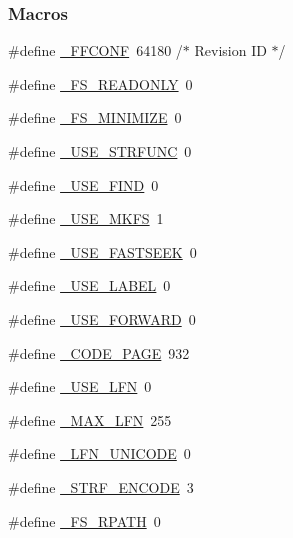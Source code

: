 \subsubsection*{Macros}
\begin{DoxyCompactItemize}
\item 
\#define \hyperlink{ffconf_8h_a45082af332369ed49492446a2d4d4c5a}{\+\_\+\+F\+F\+C\+O\+N\+F}~64180	/$\ast$ Revision I\+D $\ast$/
\item 
\#define \hyperlink{ffconf_8h_afb8d35370cfe0c23832ac2d82e854ec6}{\+\_\+\+F\+S\+\_\+\+R\+E\+A\+D\+O\+N\+L\+Y}~0
\item 
\#define \hyperlink{ffconf_8h_abefed32e4f049538ff7d7101cd8e3643}{\+\_\+\+F\+S\+\_\+\+M\+I\+N\+I\+M\+I\+Z\+E}~0
\item 
\#define \hyperlink{ffconf_8h_aaab0313f867bb008b64236239f5c2660}{\+\_\+\+U\+S\+E\+\_\+\+S\+T\+R\+F\+U\+N\+C}~0
\item 
\#define \hyperlink{ffconf_8h_abf97f960987a4a2be3b876cc45612b06}{\+\_\+\+U\+S\+E\+\_\+\+F\+I\+N\+D}~0
\item 
\#define \hyperlink{ffconf_8h_a62cdce547af40f0c1599698ee151bbd7}{\+\_\+\+U\+S\+E\+\_\+\+M\+K\+F\+S}~1
\item 
\#define \hyperlink{ffconf_8h_a85f4bdb33729ebdaaf9edeec948ac0e7}{\+\_\+\+U\+S\+E\+\_\+\+F\+A\+S\+T\+S\+E\+E\+K}~0
\item 
\#define \hyperlink{ffconf_8h_a281a4fc4668e40fc896fc865f52f9421}{\+\_\+\+U\+S\+E\+\_\+\+L\+A\+B\+E\+L}~0
\item 
\#define \hyperlink{ffconf_8h_ae49b948c9a92ff7082b88bd36f63d988}{\+\_\+\+U\+S\+E\+\_\+\+F\+O\+R\+W\+A\+R\+D}~0
\item 
\#define \hyperlink{ffconf_8h_aaf9b5cee569d93f1ebe43ea70916569f}{\+\_\+\+C\+O\+D\+E\+\_\+\+P\+A\+G\+E}~932
\item 
\#define \hyperlink{ffconf_8h_ae471cce284bf1888f9e991f5a811fc11}{\+\_\+\+U\+S\+E\+\_\+\+L\+F\+N}~0
\item 
\#define \hyperlink{ffconf_8h_a14e73a5c703a586c614b3e40b849f82c}{\+\_\+\+M\+A\+X\+\_\+\+L\+F\+N}~255
\item 
\#define \hyperlink{ffconf_8h_a8dd7e7f166bb146970b394d53cf01d80}{\+\_\+\+L\+F\+N\+\_\+\+U\+N\+I\+C\+O\+D\+E}~0
\item 
\#define \hyperlink{ffconf_8h_a36a53af63e05351562e34f082eec3f33}{\+\_\+\+S\+T\+R\+F\+\_\+\+E\+N\+C\+O\+D\+E}~3
\item 
\#define \hyperlink{ffconf_8h_a52faf11025401372f71e9d81905b7af4}{\+\_\+\+F\+S\+\_\+\+R\+P\+A\+T\+H}~0
\item 

\end{DoxyCompactItemize}
